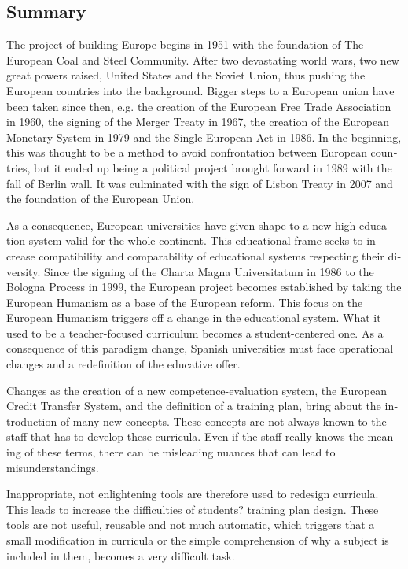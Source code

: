 \begin{otherlanguage}{english}

\chapter*{Summary}

The project of building Europe begins in 1951 with the foundation of The European Coal and Steel Community. After two devastating world wars, two new great powers raised, United States and the Soviet Union, thus pushing the European countries into the background. Bigger steps to a European union have been taken since then, e.g. the creation of the European Free Trade Association in 1960, the signing of the Merger Treaty in 1967, the creation of the European Monetary System in 1979 and the Single European Act in 1986. In the beginning, this was thought to be a method to avoid confrontation between European countries, but it ended up being a political project brought forward in 1989 with the fall of Berlin wall. It was culminated with the sign of Lisbon Treaty in 2007 and the foundation of the European Union. 

As a consequence, European universities have given shape to a new high education system valid for the whole continent. This educational frame seeks to increase compatibility and comparability of educational systems respecting their diversity. Since the signing of the Charta Magna Universitatum in 1986 to the Bologna Process in 1999, the European project becomes established by taking the European Humanism as a base of the European reform. This focus on the European Humanism triggers off a change in the educational system. What it used to be a teacher-focused curriculum becomes a student-centered one. As a consequence of this paradigm change, Spanish universities must face operational changes and a redefinition of the educative offer.

Changes as the creation of a new competence-evaluation system, the European Credit Transfer System, and the definition of a training plan, bring about the introduction of many new concepts. These concepts are not always known to the staff that has to develop these curricula. Even if the staff really knows the meaning of these terms, there can be misleading nuances that can lead to misunderstandings. 

Inappropriate, not enlightening tools are therefore used to redesign curricula. This leads to increase the difficulties of students? training plan design. These tools are not useful, reusable and not much automatic, which triggers that a small modification in curricula or the simple comprehension of why a subject is included in them, becomes a very difficult task. 


\end{otherlanguage}
